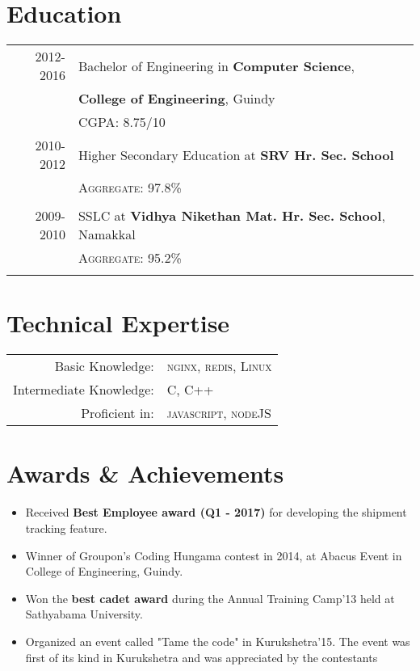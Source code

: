 \documentclass[a4paper,10pt]{article}
\begin{document}
\section{Education}
\begin{tabular}{rl}	
 \textsc{2012-2016}  & Bachelor of Engineering in \textbf{Computer Science},\\ 
 & \textbf{College of Engineering}, Guindy\\
&\normalsize \textsc{CGPA}: 8.75/10&\\
\textsc{2010-2012} & Higher Secondary Education at  \textbf{SRV Hr. Sec. School} \\
&\normalsize \textsc{Aggregate}: 97.8\% \\&\\
\textsc{2009-2010} & SSLC  at \textbf{Vidhya Nikethan Mat. Hr. Sec. School}, Namakkal\\
&\textsc{Aggregate}: 95.2\% \\&\\
\end{tabular}


\section{Technical Expertise}
\begin{tabular}{rl}
 Basic Knowledge:& \textsc{nginx}, \textsc{redis}, \textsc{Linux}\\
Intermediate Knowledge:& \textsc{C}, \textsc{C++}\\
Proficient in:& \textsc{javascript}, \textsc{nodeJS}\\
\end{tabular}


\section{Awards & Achievements}
\begin{itemize}
    \item Received \textbf{Best Employee award (Q1 - 2017)} for developing the shipment tracking feature.
    \item Winner of Groupon’s Coding Hungama contest in 2014, at Abacus Event in College of Engineering, Guindy.
    \item Won the \textbf{best cadet award} during the Annual Training Camp'13 held at Sathyabama University.
    \item Organized an event called "Tame the code" in Kurukshetra'15. The event was first of its kind in Kurukshetra and was appreciated by the contestants
\end{itemize}
\end{document}
